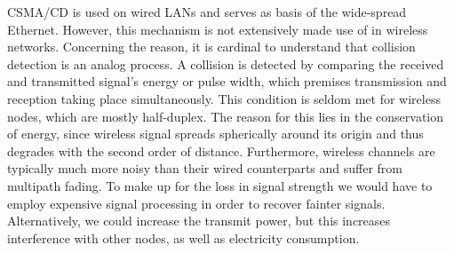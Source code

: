 CSMA/CD is used on wired LANs and serves as basis of the wide-spread Ethernet. However, this mechanism is not extensively made use of in wireless networks. Concerning the reason, it is cardinal to understand that collision detection is an analog process. A collision is detected by comparing the received and transmitted signal's energy or pulse width, which premises transmission and reception taking place simultaneously. This condition is seldom met for wireless nodes, which are mostly half-duplex. The reason for this lies in the conservation of energy, since wireless signal spreads spherically around its origin and thus degrades with the second order of distance. Furthermore, wireless channels are typically much more noisy than their wired counterparts and suffer from multipath fading. To make up for the loss in signal strength we would have to employ expensive signal processing in order to recover fainter signals. Alternatively, we could increase the transmit power, but this increases interference with other nodes, as well as electricity consumption.

%
%
%
%
%

